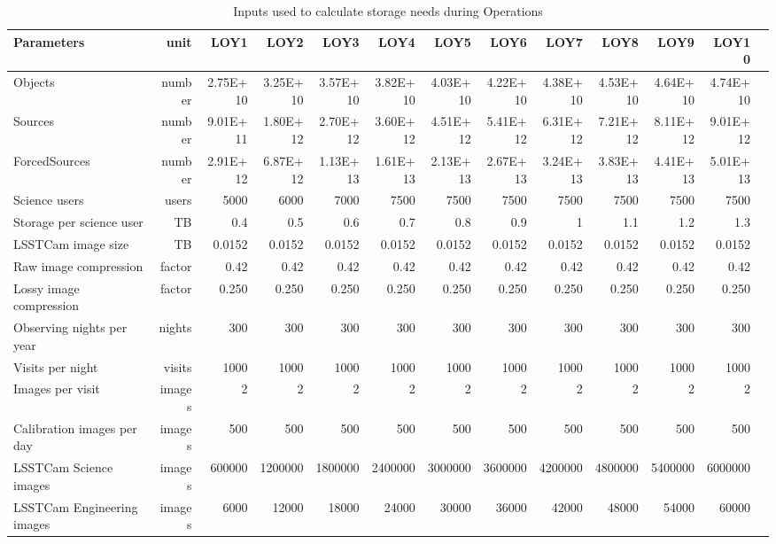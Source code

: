 \tiny \begin{longtable} { |p{}  |r  |r  |r  |r  |r  |r  |r  |r  |r  |r  |r  |r |} 
\caption{Inputs used to calculate storage needs during Operations \label{tab:storageSizingOps}}\\ 
\hline 
\textbf{Parameters}&\textbf{unit}&\textbf{LOY1}&\textbf{LOY2}&\textbf{LOY3}&\textbf{LOY4}&\textbf{LOY5}&\textbf{LOY6}&\textbf{LOY7}&\textbf{LOY8}&\textbf{LOY9}&\textbf{LOY10} \\ \hline
{Objects}&{number}&{2.75E+10}&{3.25E+10}&{3.57E+10}&{3.82E+10}&{4.03E+10}&{4.22E+10}&{4.38E+10}&{4.53E+10}&{4.64E+10}&{4.74E+10} \\ \hline
{Sources}&{number}&{9.01E+11}&{1.80E+12}&{2.70E+12}&{3.60E+12}&{4.51E+12}&{5.41E+12}&{6.31E+12}&{7.21E+12}&{8.11E+12}&{9.01E+12} \\ \hline
{ForcedSources}&{number}&{2.91E+12}&{6.87E+12}&{1.13E+13}&{1.61E+13}&{2.13E+13}&{2.67E+13}&{3.24E+13}&{3.83E+13}&{4.41E+13}&{5.01E+13} \\ \hline
{Science users}&{users}&{5000}&{6000}&{7000}&{7500}&{7500}&{7500}&{7500}&{7500}&{7500}&{7500} \\ \hline
{Storage per science user}&{TB}&{0.4}&{0.5}&{0.6}&{0.7}&{0.8}&{0.9}&{1}&{1.1}&{1.2}&{1.3} \\ \hline
{LSSTCam image size}&{TB}&{0.0152}&{0.0152}&{0.0152}&{0.0152}&{0.0152}&{0.0152}&{0.0152}&{0.0152}&{0.0152}&{0.0152} \\ \hline
{Raw image compression}&{factor}&{0.42}&{0.42}&{0.42}&{0.42}&{0.42}&{0.42}&{0.42}&{0.42}&{0.42}&{0.42} \\ \hline
{Lossy image compression}&{factor}&{0.250}&{0.250}&{0.250}&{0.250}&{0.250}&{0.250}&{0.250}&{0.250}&{0.250}&{0.250} \\ \hline
{Observing nights per year}&{nights}&{300}&{300}&{300}&{300}&{300}&{300}&{300}&{300}&{300}&{300} \\ \hline
{Visits per night}&{visits}&{1000}&{1000}&{1000}&{1000}&{1000}&{1000}&{1000}&{1000}&{1000}&{1000} \\ \hline
{Images per visit}&{images}&{2}&{2}&{2}&{2}&{2}&{2}&{2}&{2}&{2}&{2} \\ \hline
{Calibration images per day}&{images}&{500}&{500}&{500}&{500}&{500}&{500}&{500}&{500}&{500}&{500} \\ \hline
{LSSTCam Science images}&{images}&{600000}&{1200000}&{1800000}&{2400000}&{3000000}&{3600000}&{4200000}&{4800000}&{5400000}&{6000000} \\ \hline
{LSSTCam Engineering images}&{images}&{6000}&{12000}&{18000}&{24000}&{30000}&{36000}&{42000}&{48000}&{54000}&{60000} \\ \hline

\end{longtable}
